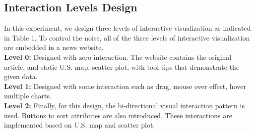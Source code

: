 \documentclass[9pt,journal,compsoc]{IEEEtran}
\begin{document}
\subsection{Interaction Levels Design}
In this experiment, we design three levels of interactive visualization as indicated in Table 1. To control the noise, all of the three levels of interactive visualization are embedded in a news website.\\
\textbf{Level 0:} Designed with zero interaction. The website contains the original article, and static U.S. map, scatter plot, with tool tips that demonstrate the given data. \\
\textbf{Level 1:} Designed with some interaction such as drag, mouse over effect, hover multiple charts. \\
\textbf{Level 2:} Finally, for this design, the bi-directional visual interaction pattern is used. Buttons to sort attributes are also introduced. These interactions are implemented based on U.S. map and scatter plot.
\end{document}
